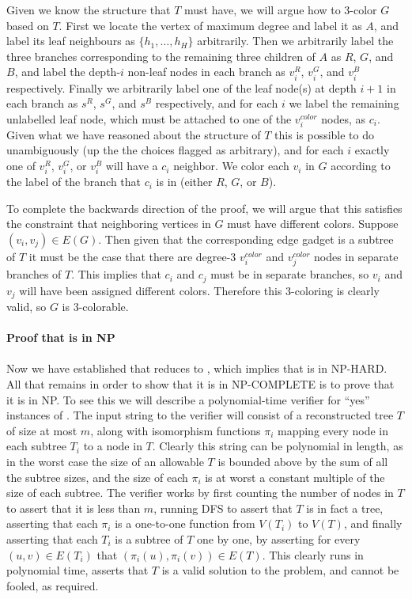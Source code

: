 Given we know the structure that $T$ must have,
we will argue how to 3-color $G$ based on $T$. First we
locate the vertex of maximum degree and label it as $A$,
and label its leaf neighbours as $\{h_1,\ldots,h_H\}$
arbitrarily. Then we arbitrarily label the three branches
corresponding to the remaining three children of $A$ as
$R$, $G$, and $B$, and label the depth-$i$ non-leaf nodes
in each branch as $v_i^R$, $v_i^G$, and $v_i^B$
respectively. Finally we arbitrarily label
one of the leaf node(s) at depth $i + 1$
in each branch as $s^R$, $s^G$, and $s^B$ respectively,
and for each $i$ we label the remaining unlabelled leaf node,
which must be attached to one of the $v_i^{color}$ nodes, as $c_i$.
Given what we have reasoned about
the structure of $T$ this is possible to do unambiguously (up
the the choices flagged as arbitrary), and for
each $i$ exactly one of $v_i^R$, $v_i^G$, or $v_i^B$
will have a $c_i$ neighbor. We color each $v_i$ in $G$
according to the label of the branch that $c_i$ is in (either
$R$, $G$, or $B$).

To complete the backwards direction of the proof, we
will argue that this satisfies the constraint that neighboring
vertices in $G$ must have different colors. Suppose $(v_i, v_j) \in E(G)$.
Then given that the corresponding edge gadget is a subtree of $T$
it must be the case that there are degree-3 $v_i^{color}$
and $v_j^{color}$ nodes in separate
branches of $T$. This implies that $c_i$ and $c_j$ must be in separate
branches, so $v_i$ and $v_j$ will have been assigned different colors.
Therefore this 3-coloring is clearly valid, so $G$ is 3-colorable.\\
\\
{\bf Proof that \tr is in NP}\\
\\
Now we have established that \tc reduces to \tr, which implies
that \tr is in NP-HARD. All that remains in order to show that it is
in NP-COMPLETE is to prove that it is in NP. To see this we will
describe a polynomial-time verifier for ``yes'' instances of \tr.
The input string to the verifier will consist
of a reconstructed tree $T$ of
size at most $m$, along with isomorphism functions $\pi_i$ mapping every
node in each subtree $T_i$ to a node in $T$. Clearly this string
can be polynomial in length, as in the worst case the size of
an allowable $T$ is bounded above by the sum of all the subtree sizes,
and the size of each $\pi_i$ is at worst a constant multiple
of the size of each subtree. The verifier works by first counting
the number of nodes in $T$ to assert that it is less than $m$,
running DFS to assert that $T$ is in fact a tree, asserting that
each $\pi_i$ is a one-to-one function from $V(T_i)$ to $V(T)$,
and finally asserting that each $T_i$ is a subtree of $T$ one by one,
by asserting for every $(u, v) \in E(T_i)$ that
$(\pi_i(u), \pi_i(v)) \in E(T)$. This clearly runs in polynomial time, 
asserts that $T$ is a valid solution to the problem, and
cannot be fooled, as required.



